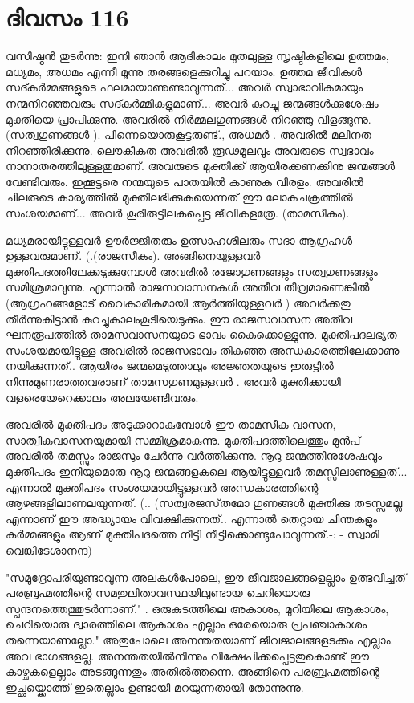  
\section{ദിവസം 116}


വസിഷ്ഠന്‍ തുടര്‍ന്നു: ഇനി ഞാന്‍ ആദികാലം മുതലുള്ള സൃഷ്ടികളിലെ ഉത്തമം, മധ്യമം, അധമം എന്നീ  മൂന്നു തരങ്ങളെക്കുറിച്ചു പറയാം. ഉത്തമ ജീവികള്‍ സദ്കര്‍മ്മങ്ങളുടെ ഫലമായാണുണ്ടാവുന്നത്‌... അവര്‍ സ്വാഭാവികമായും നന്മനിറഞ്ഞവരും സദ്കര്‍മ്മികളുമാണ്‌... അവര്‍ കുറച്ചു ജന്മങ്ങള്‍ക്കുശേഷം മുക്തിയെ പ്രാപിക്കുന്നു. അവരില്‍ നിര്‍മ്മലഗുണങ്ങള്‍ നിറഞ്ഞു വിളങ്ങുന്നു. (സത്വഗുണങ്ങള്‍ ).  പിന്നെയൊരുകൂട്ടരുണ്ട്‌., അധമര്‍ . അവരില്‍ മലിനത നിറഞ്ഞിരിക്കുന്നു. ലൌകീകത അവരില്‍ രൂഢമൂലവും അവരുടെ സ്വഭാവം നാനാതരത്തിലുള്ളതുമാണ്. അവരുടെ മുക്തിക്ക്‌ ആയിരക്കണക്കിനു ജന്മങ്ങള്‍ വേണ്ടിവരും. ഇക്കൂട്ടരെ നന്മയുടെ പാതയില്‍ കാണുക വിരളം. അവരില്‍ ചിലരുടെ കാര്യത്തില്‍ മുക്തിലഭിക്കുകയെന്നത്‌ ഈ ലോകചക്രത്തില്‍ സംശയമാണ്‌... അവര്‍ കൂരിരുട്ടിലകപ്പെട്ട ജീവികളത്രേ. (താമസീകം).

മധ്യമരായിട്ടുള്ളവര്‍ ഊര്‍ജ്ജിതരും ഉത്സാഹശീലരും സദാ ആഗ്രഹള്‍   ഉള്ളവരുമാണ്‌. (.(രാജസീകം). അങ്ങിനെയുള്ളവര്‍ മുക്തിപദത്തിലേക്കടുക്കുമ്പോള്‍ അവരില്‍ രജോഗുണങ്ങളും സത്വഗുണങ്ങളും സമിശ്രമാവുന്നു. എന്നാല്‍ രാജസവാസനകള്‍ അതീവ തീവ്രമാണെങ്കില്‍ (ആഗ്രഹങ്ങളോട്‌ വൈകാരീകമായി ആര്‍ത്തിയുള്ളവര്‍ ) അവര്‍ക്കതു തീര്‍ന്നുകിട്ടാന്‍ കുറച്ചുകാലംകൂടിയെടുക്കും.  ഈ രാജസവാസന അതീവ ഘനരൂപത്തില്‍ താമസവാസനയുടെ ഭാവം കൈക്കൊള്ളുന്നു. മുക്തിപദലഭ്യത സംശയമായിട്ടുള്ള അവരില്‍ രാജസഭാവം തികഞ്ഞ അന്ധകാരത്തിലേക്കാണു നയിക്കുന്നത്‌.. ആയിരം ജന്മമെടുത്താലും അജ്ഞതയുടെ ഇരുട്ടില്‍ നിന്നുമുണരാത്തവരാണ്‌ താമസഗുണമുള്ളവര്‍ .  അവര്‍ മുക്തിക്കായി വളരെയേറെക്കാലം അലയേണ്ടിവരും.

അവരില്‍ മുക്തിപദം അടുക്കാറാകുമ്പോള്‍ ഈ താമസീക വാസന, സാത്വീകവാസനയുമായി സമ്മിശ്രമാകുന്നു. മുക്തിപദത്തിലെത്തും മുന്‍പ്‌ അവരില്‍ തമസ്സും രാജസും ചേര്‍ന്നു വര്‍ത്തിക്കുന്നു. നൂറു ജന്മത്തിനുശേഷവും മുക്തിപദം ഇനിയുമൊരു നൂറു ജന്മങ്ങളകലെ ആയിട്ടുള്ളവര്‍ തമസ്സിലാണുള്ളത്‌... എന്നാല്‍ മുക്തിപദം സംശയമായിട്ടുള്ളവര്‍ അന്ധകാരത്തിന്റെ ആഴങ്ങളിലാണലയുന്നത്‌. (.. (സത്വരജസ്‌തമോ ഗുണങ്ങള്‍ മുക്തിക്കു തടസ്സമല്ല എന്നാണ്‌ ഈ അദ്ധ്യായം വിവക്ഷിക്കുന്നത്‌.. എന്നാല്‍ തെറ്റായ ചിന്തകളും കര്‍മ്മങ്ങളും ആണ്‌ മുക്തിപദത്തെ നീട്ടി നീട്ടിക്കൊണ്ടുപോവുന്നത്‌.-: - സ്വാമി വെങ്കിടേശാനന്ദ)

"സമുദ്രോപരിയുണ്ടാവുന്ന അലകള്‍പോലെ, ഈ ജീവജാലങ്ങളെല്ലാം ഉത്ഭവിച്ചത്‌ പരബ്രഹ്മത്തിന്റെ സമതുലിതാവസ്ഥയിലുണ്ടായ ചെറിയൊരു സ്പന്ദനത്തെത്തുടര്‍ന്നാണ്‌." . ഒരുകുടത്തിലെ അകാശം, മുറിയിലെ ആകാശം, ചെറിയൊരു ദ്വാരത്തിലെ ആകാശം എല്ലാം ഒരേയൊരു പ്രപഞ്ചാകാശം തന്നെയാണല്ലോ." അതുപോലെ അനന്തതയാണ്‌ ജീവജാലങ്ങളടക്കം എല്ലാം. അവ ഭാഗങ്ങളല്ല. അനന്തതയില്‍നിന്നും വിക്ഷേപിക്കപ്പെട്ടതുകൊണ്ട്‌ ഈ കാഴ്ചകളെല്ലാം അടങ്ങുന്നതും അതില്‍ത്തന്നെ. അങ്ങിനെ പരബ്രഹ്മത്തിന്റെ ഇച്ഛയ്ക്കൊത്ത്‌ ഇതെല്ലാം ഉണ്ടായി മറയുന്നതായി തോന്നുന്നു. 

